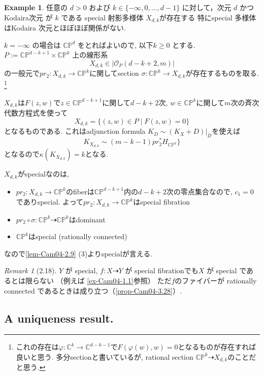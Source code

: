 \documentclass[dvipdfmx,a4paper,11pt]{article} %
\theoremstyle{definition}
\newtheorem{ex}[thm]{Example}
\theoremstyle{remark}
\newtheorem{rem}[thm]{Remark}
\numberwithin{equation}{section}
\newcommand{\C}{\mathbb{C}}
\begin{document}
\begin{ex}\cite[Example 2.19]{Cam04}
\label{ex-Cam04-2.19}
任意の \(d>0\) および \(k\in\{-\infty,0,\dots,d-1\}\) に対して，次元 \(d\) かつ Kodaira次元 が \(k\) である special 射影多様体 $X_{d, k}$が存在する
特にspecial 多様体はKodaira 次元とほぼほぼ関係がない. 

\(k=-\infty\) の場合は \(\C\mathbb P^d\) をとればよいので, 以下\(k\geq 0\) とする. 
\(P := \C\mathbb P^{d-k+1}\times \C\mathbb P^k\) 上の線形系
\[
X_{d, k} \in |\mathcal{O}_P(d-k+2,m)|
\]
の一般元で$pr_2 : X_{d, k} \to \C\mathbb P^k$に関してsection $\sigma : \C\mathbb P^k \to X_{d, k} $が存在するものを取る. \footnote{これの存在は$\varphi: \C^k \to \C^{d-k-1}$で$F(\varphi(w), w)=0$となるものが存在すれば良いと思う. 多分sectionと書いているが, rational section $\C\mathbb P^k \dashrightarrow X_{d, k}$のことだと思う.}

$X_{d, k}$は$F(z, w)$で$z \in \C\mathbb P^{d-k+1}$に関して$d-k+2$次, $w \in \C\mathbb P^k$に関して$m$次の斉次代数方程式を使って
$$
X_{d, k} = \{ (z, w) \in P \mid F(z, w)=0\}
$$
となるものである. 
これはadjunction formula $K_D\sim (K_X + D)|_{D}$を使えば
$$
K_{X_{d, k}} \sim (m-k-1)pr_{2}^{*}H_{\C\mathbb P^k}\}
$$
となるので$\kappa(K_{X_{d, k}})= k$となる. 

$X_{d, k}$がspecialなのは, 
\begin{itemize}
\item $pr_2 : X_{d, k} \to \C\mathbb P^k$のfiberは$\C\mathbb P^{d-k+1}$内の$d-k+2$次の零点集合なので, $c_1=0$でありspecial. よって$pr_2 : X_{d, k} \to \C\mathbb P^k$はspecial fibration
\item $pr_2 \circ \sigma : \C\mathbb P^k \dashrightarrow \C\mathbb P^k$はdominant
\item $\C\mathbb P^k$はspecial (rationally connected)
\end{itemize}
なので\ref{lem-Cam04-2.9} (3)よりspecialが言える. 

\end{ex}


\begin{rem}[2.18]
\(Y\) が special, \(f : X \dashrightarrow Y\) が special fibrationでも\(X\) が special であるとは限らない
（例えば \ref{ex-Cam04-1.1}参照）
ただ$f$のファイバーが rationally connected であるときは成り立つ（\ref{prop-Cam04-3.28}）.
\end{rem}


\subsection{A uniqueness result. \cite[2.4]{Cam04}}
\end{document}
